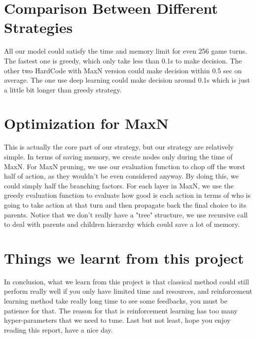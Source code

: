 \documentclass[11pt]{article}
\begin{document}
\section{Comparison Between Different Strategies}

All our model could satisfy the time and memory limit for even 256 game turns. The fastest one is greedy, which only take
less than 0.1s to make decision. The other two HardCode with MaxN version could make decision within 0.5 sec on average.
The one use deep learning could make decision around 0.1s which is just a little bit longer than greedy strategy.

\section{Optimization for MaxN}

This is actually the core part of our strategy, but our strategy are relatively simple. In terms of saving memory, we 
create nodes only during the time of MaxN. For MaxN pruning, we use our evaluation function to chop off the worst 
half of action, as they wouldn't be even considered anyway. By doing this, we could simply half the branching factors.
For each layer in MaxN, we use the greedy 
evaluation function to evaluate how good is each action in terms of who is going to take action at that turn
and then propagate back the final choice to its parents.
Notice that we don't really have a "tree" structure, we use recursive call to deal with parents and children 
hierarchy which could save a lot of memory.

\section{Things we learnt from this project}
In conclusion, what we learn from this project is that classical method could still perform really well 
if you only have limited time and resources, and reinforcement learning method take really long time to see some 
feedbacks, you must be patience for that. The reason for that is reinforcement learning has too many hyper-parameters
that we need to tune. Last but not least, hope you enjoy reading this report, have a nice day.
\end{document}
